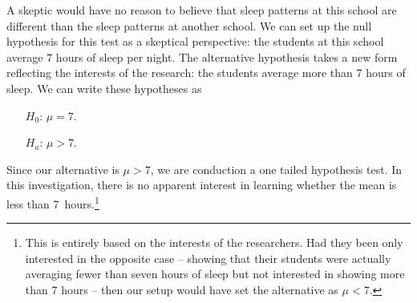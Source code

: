 A skeptic would have no reason to believe that sleep patterns at this school are different than the sleep patterns at another school.
We can set up the null hypothesis for this test as a skeptical perspective: the students at this school average 7 hours of sleep per night. The alternative hypothesis takes a new form reflecting the interests of the research: the students average more than 7 hours of sleep. We can write these hypotheses as
\begin{itemize}
\setlength{\itemsep}{0mm}
\item[$H_0$:] $\mu = 7$.
\item[$H_a$:] $\mu > 7$.
\end{itemize}

Since our alternative is $\mu > 7$, we are conduction a one tailed hypothesis test.
 In this investigation, there is no apparent interest in learning whether the mean is less than 7~hours.\footnote{This is entirely based on the interests of the researchers. Had they been only interested in the opposite case -- showing that their students were actually averaging fewer than seven hours of sleep but not interested in showing more than 7 hours -- then our setup would have set the alternative as $\mu < 7$.} 




